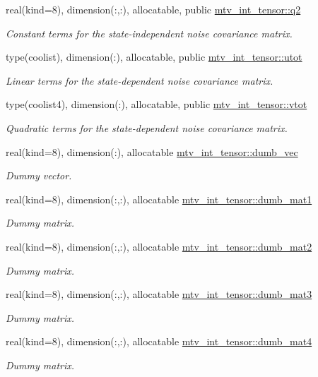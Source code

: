 \begin{DoxyCompactItemize}
real(kind=8), dimension(\+:,\+:), allocatable, public \hyperlink{namespacemtv__int__tensor_a83f1ba468ee4599801c226c93115bad3}{mtv\+\_\+int\+\_\+tensor\+::q2}
\begin{DoxyCompactList}\small\item\em Constant terms for the state-\/independent noise covariance matrix. \end{DoxyCompactList}\item 
type(coolist), dimension(\+:), allocatable, public \hyperlink{namespacemtv__int__tensor_a4a2acf9c88ba182967568ecfdd2eae0a}{mtv\+\_\+int\+\_\+tensor\+::utot}
\begin{DoxyCompactList}\small\item\em Linear terms for the state-\/dependent noise covariance matrix. \end{DoxyCompactList}\item 
type(coolist4), dimension(\+:), allocatable, public \hyperlink{namespacemtv__int__tensor_a35e35414488bc119d9604ada011cc842}{mtv\+\_\+int\+\_\+tensor\+::vtot}
\begin{DoxyCompactList}\small\item\em Quadratic terms for the state-\/dependent noise covariance matrix. \end{DoxyCompactList}\item 
real(kind=8), dimension(\+:), allocatable \hyperlink{namespacemtv__int__tensor_a192990600ca27522b2027f6c927572f7}{mtv\+\_\+int\+\_\+tensor\+::dumb\+\_\+vec}
\begin{DoxyCompactList}\small\item\em Dummy vector. \end{DoxyCompactList}\item 
real(kind=8), dimension(\+:,\+:), allocatable \hyperlink{namespacemtv__int__tensor_a6b350b05230b163e36094160758f2ee8}{mtv\+\_\+int\+\_\+tensor\+::dumb\+\_\+mat1}
\begin{DoxyCompactList}\small\item\em Dummy matrix. \end{DoxyCompactList}\item 
real(kind=8), dimension(\+:,\+:), allocatable \hyperlink{namespacemtv__int__tensor_a3c9c33307f4589ac4fecf901333721fd}{mtv\+\_\+int\+\_\+tensor\+::dumb\+\_\+mat2}
\begin{DoxyCompactList}\small\item\em Dummy matrix. \end{DoxyCompactList}\item 
real(kind=8), dimension(\+:,\+:), allocatable \hyperlink{namespacemtv__int__tensor_a632f7eb0b8cc4e403730d68a985393dd}{mtv\+\_\+int\+\_\+tensor\+::dumb\+\_\+mat3}
\begin{DoxyCompactList}\small\item\em Dummy matrix. \end{DoxyCompactList}\item 
real(kind=8), dimension(\+:,\+:), allocatable \hyperlink{namespacemtv__int__tensor_abb373b53bcba3f369d21fd391e0d72ff}{mtv\+\_\+int\+\_\+tensor\+::dumb\+\_\+mat4}
\begin{DoxyCompactList}\small\item\em Dummy matrix. \end{DoxyCompactList}\end{DoxyCompactItemize}
